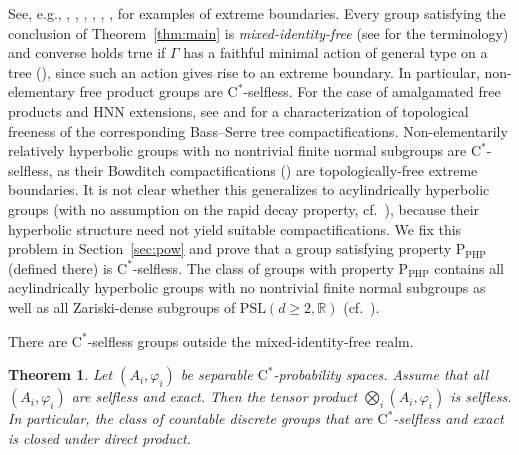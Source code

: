 \documentclass[12pt,nosumlimits,nonamelimits]{amsart}
\newtheorem{thm}{Theorem}
\theoremstyle{remark}
\theoremstyle{definition}
\newcommand{\IR}{\mathbb{R}}
\newcommand{\vp}{\varphi}
\newcommand{\Ga}{\Gamma}
\begin{document}
See, e.g., \cite{bowditch}, \cite{bio}, \cite{flmms}, \cite{io}, 
\cite{jr}, \cite{ls}, \cite{lbmb} for examples of extreme 
boundaries. Every group satisfying the conclusion 
of Theorem~\ref{thm:main} is \emph{mixed-identity-free} 
(see \cite{ho} for the terminology) 
and converse holds true if $\Ga$ has a faithful minimal action 
of general type on a tree (\cite{flmms}), since 
such an action gives rise to an extreme boundary. 
In particular, non-elementary free product groups 
are $\mathrm{C}^*$-selfless. 
For the case of amalgamated free products and 
HNN extensions, see \cite{flmms} and \cite{io} for 
a characterization of topological freeness of 
the corresponding Bass--Serre tree compactifications. 
Non-elementarily relatively hyperbolic 
groups with no nontrivial finite normal 
subgroups are $\mathrm{C}^*$-selfless, as their Bowditch 
compactifications (\cite{bowditch}) are topologically-free 
extreme boundaries. 
It is not clear whether this generalizes to 
acylindrically hyperbolic groups (with no assumption 
on the rapid decay property, cf.\ \cite{agkep}), because their hyperbolic 
structure need not yield suitable compactifications. 
We fix this problem in Section~\ref{sec:pow} and prove 
that a group satisfying property $\mathrm{P}_{\mathrm{PHP}}$ 
(defined there) is $\mathrm{C}^*$-selfless. The class of groups 
with property $\mathrm{P}_{\mathrm{PHP}}$ contains 
all acylindrically hyperbolic groups with no nontrivial 
finite normal subgroups as well as all Zariski-dense subgroups 
of $\mathrm{PSL}(d\geq2,\IR)$ (cf.\ \cite{vigdorovich}). 

There are $\mathrm{C}^*$-selfless groups outside 
the mixed-identity-free realm. 
%
\begin{thm}\label{thm:tensor}
Let $(A_i,\vp_i)$ be separable $\mathrm{C}^*$-prob\-a\-bility spaces.
Assume that all $(A_i,\vp_i)$ are selfless and exact. 
Then the tensor product $\bigotimes_i (A_i,\vp_i)$ is selfless. 
In particular, the class of countable discrete groups that are 
$\mathrm{C}^*$-selfless and exact is closed under direct product. 
\end{thm}
%
\end{document}
